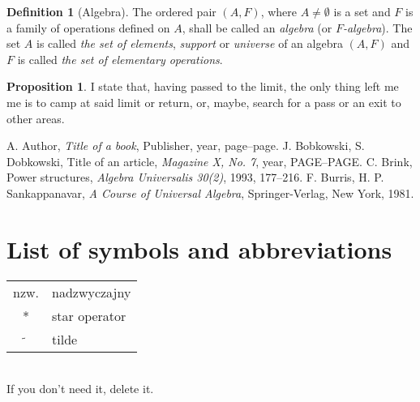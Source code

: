 \documentclass[a4paper,11pt,twoside]{report}
\theoremstyle{definition}
\newtheorem{proposition}[theorem]{Proposition}
\newtheorem{definition}[theorem]{Definition}
\begin{document}
\begin{definition}[Algebra]
	The ordered pair $(A,F)$, where $A\neq \emptyset$ is a set and $F$ is a family of operations defined on $A$, shall be called an \emph{algebra} (or \emph{$F$-algebra}). The set $A$ is called \emph{the set of elements}, \emph{support} or \emph{universe} of an algebra $(A,F)$ and $F$ is called \emph{the set of elementary operations}.
\end{definition}

\begin{proposition}
	I state that, having passed to the limit, the only thing left me me is to camp at said limit or return, or, maybe, search for a pass or an exit to other areas.
\end{proposition}







\begin{thebibliography}{20} %

 A. Author, \emph{Title of a book}, Publisher, year, page--page.
 J. Bobkowski, S. Dobkowski, Title of an article, \emph{Magazine X, No. 7}, year, PAGE--PAGE.
 C. Brink, Power structures, \emph{Algebra Universalis 30(2)}, 1993, 177--216.
 F. Burris, H. P. Sankappanavar, \emph{A Course of Universal Algebra}, Springer-Verlag, New York, 1981.
\end{thebibliography}
\thispagestyle{empty}



\chapter*{List of symbols and abbreviations}

\begin{tabular}{cl}
nzw. & nadzwyczajny \\
* & star operator \\
$\widetilde{}$ & tilde 
\end{tabular}
\\
If you don't need it, delete it.
\thispagestyle{empty}
\end{document}
